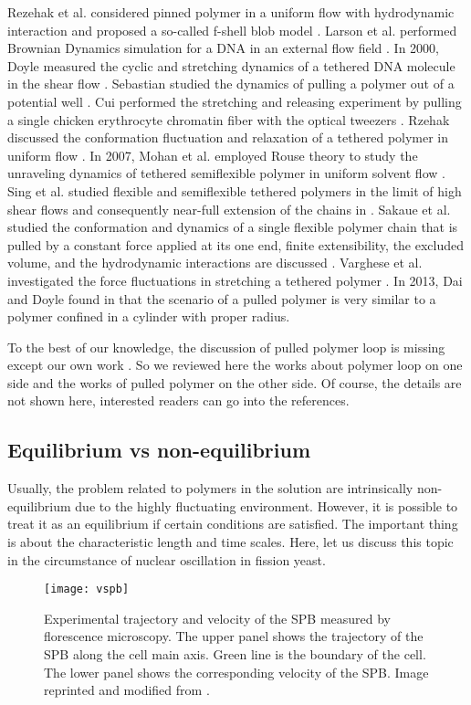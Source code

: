 Rezehak et al. considered pinned polymer in a uniform flow with hydrodynamic interaction and proposed a so-called f-shell blob model \cite{Rzehak1999}. Larson et al. performed Brownian Dynamics simulation for a DNA in an external flow field \cite{Larson1999}. In 2000, Doyle measured the cyclic and stretching dynamics of a tethered DNA molecule in the shear flow \cite{Doyle2000, Ladoux2000a}. Sebastian studied the dynamics of pulling a polymer out of a potential well \cite{Sebastian2000}. Cui performed the stretching and releasing experiment by pulling a single chicken erythrocyte chromatin fiber with the optical tweezers \cite{Cui2000a}. Rzehak discussed the conformation fluctuation and relaxation of a tethered polymer in uniform flow \cite{Rzehak2003a}. In 2007, Mohan et al. employed Rouse theory to study the unraveling dynamics of tethered semiflexible polymer in uniform solvent flow \cite{Mohan2007}. Sing et al. studied flexible and semiflexible tethered polymers in the limit of high shear flows and consequently near-full extension of the chains in \cite{Sing2011}.  Sakaue et al. studied the conformation and dynamics of a single flexible polymer chain that is pulled by a constant force applied at its one end, finite extensibility, the excluded volume, and the hydrodynamic interactions are discussed \cite{Sakaue2012a}.  Varghese et al. investigated the force fluctuations in stretching a tethered polymer \cite{Varghese2013}.
In 2013, Dai and Doyle found in \cite{Dai2013a} that the scenario of a pulled polymer is very similar to a polymer confined in a cylinder with proper radius.

To the best of our knowledge, the discussion of pulled polymer loop is missing except our own work \cite{Lin2015}. So we reviewed here the works about polymer loop on one side and the works of pulled polymer on the other side. Of course, the details are not shown here, interested readers can go into the references.

\subsection{Equilibrium vs non-equilibrium}
\label{sub:equilibrium_vs_non_equilibrium}

Usually, the problem related to polymers in the solution are intrinsically non-equilibrium due to the highly fluctuating environment. However, it is possible to treat it as an equilibrium if certain conditions are satisfied.
The important thing is about the characteristic length and time scales. Here, let us discuss this topic in the circumstance of nuclear oscillation in fission yeast. 
\begin{figure}[htpb]
    \centering
    \texttt{[image: vspb]}
    \caption{Experimental trajectory and velocity of the SPB measured by florescence microscopy. The upper panel shows the trajectory of the SPB along the cell main axis. Green line is the boundary of the cell. The lower panel shows the corresponding velocity of the SPB. Image reprinted and modified from \cite{Vogel2009}.}
    \label{fig:vspb}
\end{figure}


